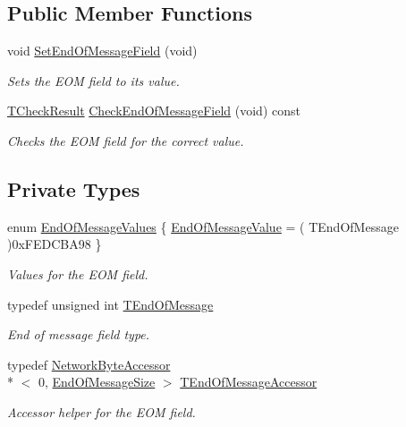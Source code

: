 \subsection*{Public Member Functions}
\begin{DoxyCompactItemize}
\item 
void \hyperlink{class_terra_swarm_1_1_message_ender_af69030fc95ad65634ce03e0edb5f3bdd}{Set\-End\-Of\-Message\-Field} (void)
\begin{DoxyCompactList}\small\item\em Sets the E\-O\-M field to its value. \end{DoxyCompactList}\item 
\hyperlink{class_terra_swarm_1_1_message_ender_a4f3f1bf696190619eb5580c3007ac83a}{T\-Check\-Result} \hyperlink{class_terra_swarm_1_1_message_ender_abc51a9a7a6fb91254ce5cc2ea8edf5bb}{Check\-End\-Of\-Message\-Field} (void) const 
\begin{DoxyCompactList}\small\item\em Checks the E\-O\-M field for the correct value. \end{DoxyCompactList}\end{DoxyCompactItemize}
\subsection*{Private Types}
\begin{DoxyCompactItemize}
\item 
enum \hyperlink{class_terra_swarm_1_1_message_ender_a0ba74240f52a1197820539e30b216b91}{End\-Of\-Message\-Values} \{ \hyperlink{class_terra_swarm_1_1_message_ender_a0ba74240f52a1197820539e30b216b91ac6e6cab219b02e3512687915ec26be5c}{End\-Of\-Message\-Value} = ( T\-End\-Of\-Message )0x\-F\-E\-D\-C\-B\-A98
 \}
\begin{DoxyCompactList}\small\item\em Values for the E\-O\-M field. \end{DoxyCompactList}\item 
typedef unsigned int \hyperlink{class_terra_swarm_1_1_message_ender_a34ecb0835fc9e09799dd1a30fcf5ff65}{T\-End\-Of\-Message}
\begin{DoxyCompactList}\small\item\em End of message field type. \end{DoxyCompactList}\item 
typedef \hyperlink{class_terra_swarm_1_1_network_byte_accessor}{Network\-Byte\-Accessor}\\*
$<$ 0, \hyperlink{class_terra_swarm_1_1_message_ender_a69b4e82c4fb985160b5bbd11c0fc65ffa61b601ee3929906b25d5d72130acc98e}{End\-Of\-Message\-Size} $>$ \hyperlink{class_terra_swarm_1_1_message_ender_aa82232ef2e15f3c918e5d8187dff86f8}{T\-End\-Of\-Message\-Accessor}
\begin{DoxyCompactList}\small\item\em Accessor helper for the E\-O\-M field. \end{DoxyCompactList}\end{DoxyCompactItemize}


